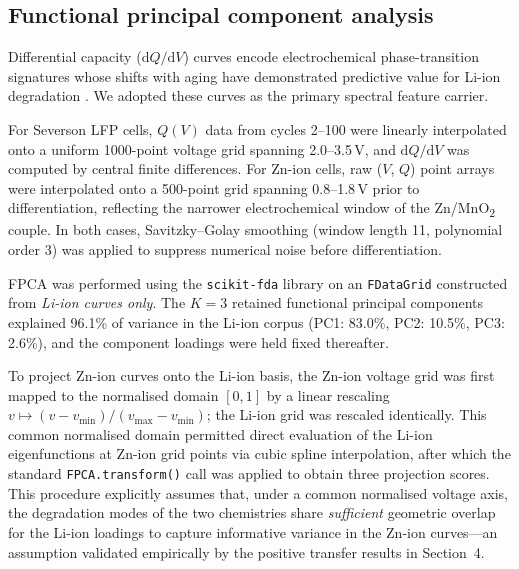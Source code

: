 \subsection{Functional principal component analysis}
\label{sec:fpca}

Differential capacity ($\mathrm{d}Q/\mathrm{d}V$) curves encode
electrochemical phase-transition signatures whose shifts with aging have
demonstrated predictive value for Li-ion degradation \cite{severson2019}.
We adopted these curves as the primary spectral feature carrier.

For Severson LFP cells, $Q(V)$ data from cycles 2--100 were linearly
interpolated onto a uniform 1000-point voltage grid spanning 2.0--3.5\,V,
and $\mathrm{d}Q/\mathrm{d}V$ was computed by central finite differences.
For Zn-ion cells, raw ($V$, $Q$) point arrays were interpolated onto a
500-point grid spanning 0.8--1.8\,V prior to differentiation, reflecting
the narrower electrochemical window of the Zn/MnO\textsubscript{2} couple.
In both cases, Savitzky--Golay smoothing (window length 11, polynomial
order 3) was applied to suppress numerical noise before differentiation.

FPCA was performed using the \texttt{scikit-fda} library
\cite{ramos2024} on an \texttt{FDataGrid} constructed from \emph{Li-ion
curves only}.  The $K = 3$ retained functional principal components explained
96.1\% of variance in the Li-ion corpus (PC1: 83.0\%, PC2: 10.5\%,
PC3: 2.6\%), and the component loadings were held fixed thereafter.

To project Zn-ion curves onto the Li-ion basis, the Zn-ion voltage grid was
first mapped to the normalised domain $[0, 1]$ by a linear rescaling
$v \mapsto (v - v_{\min})/(v_{\max} - v_{\min})$; the Li-ion grid was
rescaled identically.  This common normalised domain permitted direct
evaluation of the Li-ion eigenfunctions at Zn-ion grid points via cubic
spline interpolation, after which the standard
\texttt{FPCA.transform()} call was applied to obtain three projection
scores.  This procedure explicitly assumes that, under a common normalised
voltage axis, the degradation modes of the two chemistries share
\emph{sufficient} geometric overlap for the Li-ion loadings to capture
informative variance in the Zn-ion curves---an assumption validated empirically
by the positive transfer results in Section~4.

